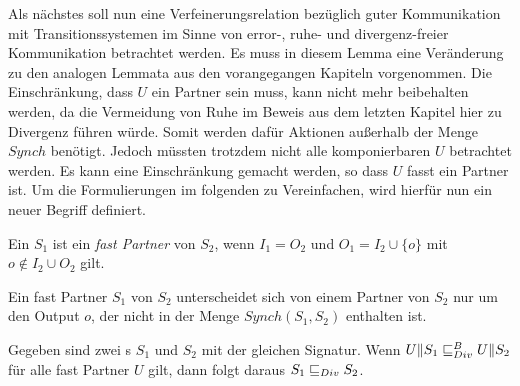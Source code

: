 Als nächstes soll nun eine Verfeinerungsrelation bezüglich guter Kommunikation
mit Transitionssystemen im Sinne von error-, ruhe- und divergenz-freier
Kommunikation betrachtet werden. Es muss in diesem Lemma eine Veränderung zu
den analogen Lemmata aus den vorangegangen Kapiteln vorgenommen. Die
Einschränkung, dass $U$ ein Partner sein muss, kann nicht mehr beibehalten
werden, da die Vermeidung von Ruhe im Beweis aus dem letzten Kapitel hier zu
Divergenz führen würde. Somit werden dafür Aktionen außerhalb der Menge $Synch$
benötigt. Jedoch müssten trotzdem nicht alle komponierbaren $U$ betrachtet
werden. Es kann eine Einschränkung gemacht werden, so dass $U$ fasst ein
Partner ist. Um die Formulierungen im folgenden zu Vereinfachen, wird hierfür
nun ein neuer Begriff definiert.

\begin{Def}
  Ein \EIO{} $S_1$ ist ein \emph{fast Partner} von $S_2$, wenn $I_1=O_2$ und
  $O_1=I_2\cup\{o\}$ mit $o\notin I_2\cup O_2$ gilt.
\end{Def}

Ein fast Partner $S_1$ von $S_2$ unterscheidet sich von einem Partner von $S_2$
nur um den Output $o$, der nicht in der Menge $Synch(S_1,S_2)$ enthalten ist.

\begin{lem}
\label{lemDivVerfeinerung}
  Gegeben sind zwei \EIO{}s $S_1$ und $S_2$ mit der gleichen Signatur. Wenn
  $U\|S_1\sqsubseteq _{Div}^B{} U\|S_2$ für alle fast Partner $U$ gilt, dann folgt daraus
  $S_1\sqsubseteq _{Div}{} S_2$.
\end{lem}


